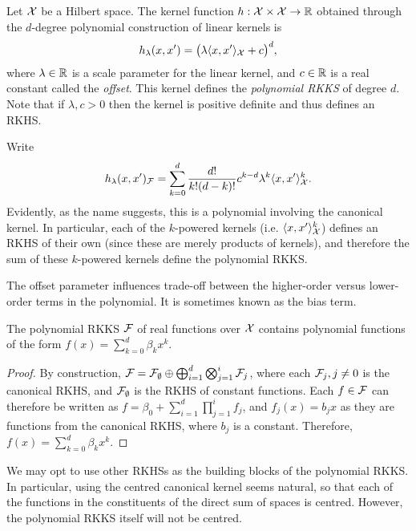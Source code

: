 \begin{definition}
  Let ${\mathcal X}$ be a Hilbert space.
  The kernel function $h:{\mathcal X}\times{\mathcal X}\to\mathbb{R}$ obtained through the $d$-degree polynomial construction of linear kernels is
  \[
    h_\lambda(x,x') = \big(\lambda\langle x,x'\rangle_{\mathcal X} + c\big)^d,
  \]
  where $\lambda \in \mathbb{R}$ is a scale parameter for the linear kernel, and $c \in \mathbb{R}$ is a real constant called the \emph{offset}.
  This kernel defines the \emph{polynomial RKKS} of degree $d$.
  Note that if $\lambda,c > 0$ then the kernel is positive definite and thus defines an RKHS.
\end{definition}

Write
\begin{align*}
  h_\lambda(x,x')_{\mathcal F} = \sum_{k=0}^d \frac{d!}{k!(d-k)!} c^{k-d} \lambda^k \langle x,x'\rangle_{\mathcal X}^k.
\end{align*}
Evidently, as the name suggests, this is a polynomial involving the canonical kernel.
In particular, each of the $k$-powered kernels (i.e. $\langle x,x'\rangle_{\mathcal X}^k$) defines an RKHS of their own (since these are merely products of kernels), and therefore the sum of these $k$-powered kernels define the polynomial RKKS.

The offset parameter influences trade-off between the higher-order versus lower-order terms in the polynomial.
It is sometimes known as the bias term.

\begin{proposition}
  The polynomial RKKS ${\mathcal F}$ of real functions over ${\mathcal X}$ contains polynomial functions of the form $f(x)=\sum_{k=0}^d \beta_k x^k$.
\end{proposition}

\begin{proof}
  By construction, ${\mathcal F} = {\mathcal F}_\emptyset \oplus \bigoplus_{i=1}^d\bigotimes_{j=1}^i {\mathcal F}_j$, where each ${\mathcal F}_j, j \neq 0$ is the canonical RKHS, and ${\mathcal F}_\emptyset$ is the RKHS of constant functions.
  Each $f \in {\mathcal F}$ can therefore be written as $f = \beta_0 + \sum_{i=1}^d\prod_{j=1}^i f_j$, and $f_j(x)= b_j x$ as they are functions from the canonical RKHS, where $b_j$ is a constant.
  Therefore, $f(x) = \sum_{k=0}^d \beta_k x^k$.
\end{proof}

\begin{remark}
  We may opt to use other RKHSs as the building blocks of the polynomial RKKS.
  In particular, using the centred canonical kernel seems natural, so that each of the functions in the constituents of the direct sum of spaces is centred.
  However, the polynomial RKKS itself will not be centred.
\end{remark}


